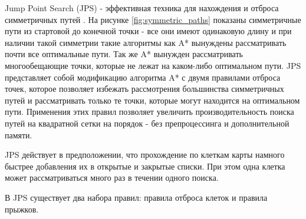 Jump Point Search (JPS) - эффективная техника для нахождения и отброса симметричных путей \cite{IMPROVING_JPS}. На рисунке \ref{fig:symmetric_paths} показаны симметричные пути из стартовой до конечной точки - все они имеют одинаковую длину и при наличии такой симметрии такие алгоритмы как A* вынуждены рассматривать почти все оптимальные пути. Так же A* вынужден рассматривать многообещающие точки, которые не лежат на каком-либо оптимальном пути. JPS представляет собой модификацию алгоритма A* с двумя правилами отброса точек, которое позволяет избежать рассмотрения большинства симметричных путей и рассматривать только те точки, которые могут находится на оптимальном пути. Применения этих правил позволяет увеличить производительность поиска путей на квадратной сетки на порядок - без препроцессинга и дополнительной памяти.

{
	\mybox[x=1,y=1,color=green]
	\mybox[x=4,y=4,color=green]
	
	\mygrid[width=6, height=6]
	
	\myarrow[startx=1,starty=1,endx=1,endy=2,color=blue]
	\myarrow[startx=1,starty=2,endx=1,endy=3,color=blue]
	\myarrow[startx=1,starty=3,endx=1,endy=4,color=blue]
	\myarrow[startx=1,starty=4,endx=2,endy=4,color=blue]
	\myarrow[startx=2,starty=4,endx=3,endy=4,color=blue]
	\myarrow[startx=3,starty=4,endx=4,endy=4,color=blue]
	
	\myarrow[startx=4,starty=1,endx=4,endy=2,color=orange]
	\myarrow[startx=4,starty=2,endx=4,endy=3,color=orange]
	\myarrow[startx=4,starty=3,endx=4,endy=4,color=orange]
	\myarrow[startx=1,starty=1,endx=2,endy=1,color=orange]
	\myarrow[startx=2,starty=1,endx=3,endy=1,color=orange]
	\myarrow[startx=3,starty=1,endx=4,endy=1,color=orange]
	
	\myarrow[startx=1,starty=2,endx=2,endy=2,color=red]
	\myarrow[startx=2,starty=2,endx=3,endy=2,color=red]
	\myarrow[startx=3,starty=2,endx=4,endy=2,color=red]
	
	\myarrow[startx=1,starty=3,endx=2,endy=3,color=black]
	\myarrow[startx=2,starty=3,endx=3,endy=3,color=black]
	\myarrow[startx=3,starty=3,endx=4,endy=3,color=black]
}


JPS действует в предположении, что прохождение по клеткам карты намного быстрее добавления их в открытые и закрытые списки. При этом одна клетка может рассматриваться много раз в течении одного поиска.

В JPS существует два набора правил: правила отброса клеток и правила прыжков.

